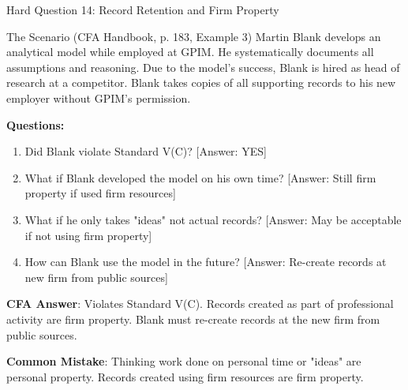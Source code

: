 \documentclass{beamer}
\begin{document}
	\begin{frame}{Hard Question 14: Record Retention and Firm Property}
		\begin{block}{The Scenario (CFA Handbook, p. 183, Example 3)}
			Martin Blank develops an analytical model while employed at GPIM. He systematically documents all assumptions and reasoning. Due to the model's success, Blank is hired as head of research at a competitor. Blank takes copies of all supporting records to his new employer without GPIM's permission.
		\end{block}
		
		\vspace{0.2cm}
		\textbf{Questions:}
		\begin{enumerate}
			\item Did Blank violate Standard V(C)? \textcolor{cfared}{[Answer: YES]}
			\item What if Blank developed the model on his own time? \textcolor{cfared}{[Answer: Still firm property if used firm resources]}
			\item What if he only takes "ideas" not actual records? \textcolor{cfared}{[Answer: May be acceptable if not using firm property]}
			\item How can Blank use the model in the future? \textcolor{cfared}{[Answer: Re-create records at new firm from public sources]}
		\end{enumerate}
		
		\vspace{0.2cm}
		\textcolor{cfablue}{\textbf{CFA Answer}}: Violates Standard V(C). Records created as part of professional activity are firm property. Blank must re-create records at the new firm from public sources.
		
		\vspace{0.1cm}
		\textcolor{cfared}{\textbf{Common Mistake}}: Thinking work done on personal time or "ideas" are personal property. Records created using firm resources are firm property.
	\end{frame}
	
\end{document}
